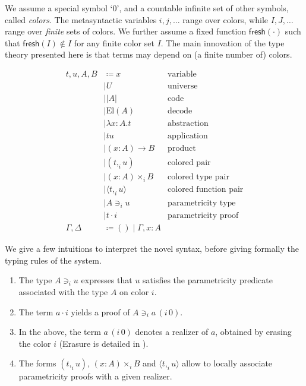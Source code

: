 \documentclass[english]{PaperTools/latex/lipics}
\newcommand\CP[3]{(#2,_{#1} #3)}
\newcommand\CTimes[2]{(#2) ×_{#1}}
\newcommand\param[1]{\!\cdot\!#1}
\newcommand\op[1]{∋_{#1}}
\newcommand\fp[3]{⟨#2 ,_{#1} #3⟩}
\newcommand\mor[2]{({#1}\,{#2})}
\newcommand\proj[2]{{#2}\,\mor{#1}0}
\def\fresh#1{\mathsf{fresh}(#1)}
\def\El#1{\mathrm{El}(#1)}
\begin{document}
We assume a special symbol ‘0’, and a countable infinite set of other
symbols, called \emph{colors}.
The metasyntactic variables $i,j,\ldots$ range over colors, while
$I,J,…$ range over \emph{finite} sets of colors.
We further assume a fixed function $\fresh{·}$ such that
$\fresh{I} ∉ I$ for any finite color set $I$.
%
The main innovation of the type theory
presented here is that terms may depend on (a finite number of)
colors.
\begin{definition}
  \begin{align*}
    t,u,A,B & \coloneqq x & \text {variable} \\
            & \mid U & \text{universe} \\ 
            & \mid |A| & \text{code} \\ 
            & \mid \El{A} & \text{decode} \\
            & \mid λx:A. t & \text{abstraction} \\
            & \mid t u & \text{application} \\ 
            & \mid (x:A) → B & \text{product} \\
            & \mid \CP i t u & \text{colored pair} \\
            & \mid \CTimes i {x:A} B  & \text{colored type pair} \\
            & \mid \fp i t u & \text{colored function pair}\\
            & \mid A \op i u & \text{parametricity type} \\
            & \mid t \param i & \text{parametricity proof} \\
    \Gamma,\Delta & \coloneqq () \mid \Gamma,x:A
  \end{align*}
\end{definition}

We give a few intuitions to interpret the novel syntax, before giving formally the typing rules of the system. 
\begin{enumerate}
\item The type $A \op i u$ expresses that $u$ satisfies the
  parametricity predicate associated with the type $A$ on color $i$.
\item The term $a \param i$ yields a proof of $A \op i \proj i a$.
\item In the above, the term $\proj i a$ denotes a realizer of $a$,
  obtained by erasing the color $i$ (Erasure is detailed in
  ).
\item The forms $\CP i t u$, $\CTimes i {x:A} B$ and $\fp i t u$ allow to
  locally associate parametricity proofs with a given realizer.
\end{enumerate}
\end{document}
